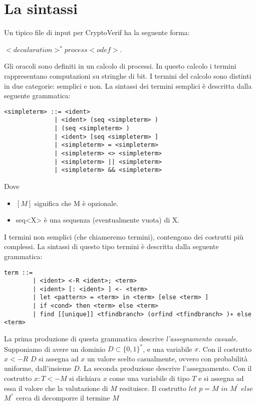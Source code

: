 \documentclass[a4paper,openright,twoside,12pt]{report}
\begin{document}
\section{La sintassi}
Un tipico file di input per CryptoVerif ha la seguente forma: \begin{center}
                                                               $<decalaration>^{*} process  <odef>$.
                                                              \end{center}
Gli oracoli sono definiti in un calcolo di processi. In questo calcolo i termini rappresentano computazioni su stringhe di bit.
I termini del calcolo sono distinti in due categorie: semplici e non. La sintassi dei termini semplici \`e descritta dalla seguente grammatica:
\begin{verbatim}
<simpleterm> ::= <ident>
              | <ident> (seq <simpleterm> )
              | (seq <simpleterm> )
              | <ident> [seq <simpleterm> ]
              | <simpleterm> = <simpleterm>
              | <simpleterm> <> <simpleterm>
              | <simpleterm> || <simpleterm>
              | <simpleterm> && <simpleterm>
\end{verbatim}
Dove
\begin{itemize}
 \item $[M]$ significa che M \`e opzionale.
 \item seq<X> \`e una sequenza (eventualmente vuota) di X.
\end{itemize}
I termini non semplici (che chiameremo termini), contengono dei costrutti pi\`u complessi.
La sintassi di questo tipo termini \`e descritta dalla seguente grammatica:
\begin{verbatim}
term ::= 
        | <ident> <-R <ident>; <term>
        | <ident> [: <ident> ] <- <term>
        | let <pattern> = <term> in <term> [else <term> ]
        | if <cond> then <term> else <term>
        | find [[unique]] <tfindbranch> (orfind <tfindbranch> )∗ else <term>
\end{verbatim}
La prima produzione di questa grammatica descrive \emph{l'assegnamento casuale}. Supponiamo di avere un dominio $D \subset \{0,1\}^{*}$, 
e una variabile
$x$. Con il costrutto $x<-R$ $D$ si assegna ad $x$ un valore scelto casualmente, ovvero con probabilit\`a uniforme, dall'insieme $D$.
La seconda produzione descrive l'assegnamento. Con il costrutto $x:T <- M$ si dichiara $x$ come una variabile di tipo $T$ e si assegna
ad essa il valore che la valutazione di $M$ resituisce. Il costrutto $let$ $p = M$ $in$ $M^{'}$ $else$ $M^{''}$ cerca di decomporre il termine $M$
\end{document}
